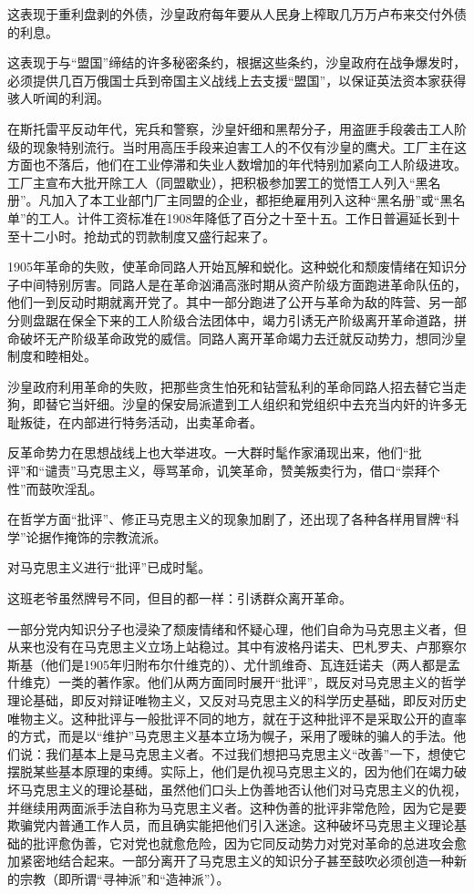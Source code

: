 这表现于重利盘剥的外债，沙皇政府每年要从人民身上榨取几万万卢布来交付外债的利息。

这表现于与“盟国”缔结的许多秘密条约，根据这些条约，沙皇政府在战争爆发时，必须提供几百万俄国士兵到帝国主义战线上去支援“盟国”，以保证英法资本家获得骇人听闻的利润。

在斯托雷平反动年代，宪兵和警察，沙皇奸细和黑帮分子，用盗匪手段袭击工人阶级的现象特别流行。当时用高压手段来迫害工人的不仅有沙皇的鹰犬。工厂主在这方面也不落后，他们在工业停滞和失业人数增加的年代特别加紧向工人阶级进攻。工厂主宣布大批开除工人（同盟歇业），把积极参加罢工的觉悟工人列入“黑名册”。凡加入了本工业部门厂主同盟的企业，都拒绝雇用列入这种“黑名册”或“黑名单”的工人。计件工资标准在1908年降低了百分之十至十五。工作日普遍延长到十至十二小时。抢劫式的罚款制度又盛行起来了。

1905年革命的失败，使革命同路人开始瓦解和蜕化。这种蜕化和颓废情绪在知识分子中间特别厉害。同路人是在革命汹涌高涨时期从资产阶级方面跑进革命队伍的，他们一到反动时期就离开党了。其中一部分跑进了公开与革命为敌的阵营、另一部分则盘踞在保全下来的工人阶级合法团体中，竭力引诱无产阶级离开革命道路，拼命破坏无产阶级革命政党的威信。同路人离开革命竭力去迁就反动势力，想同沙皇制度和睦相处。

沙皇政府利用革命的失败，把那些贪生怕死和钻营私利的革命同路人招去替它当走狗，即替它当奸细。沙皇的保安局派遣到工人组织和党组织中去充当内奸的许多无耻叛徒，在内部进行特务活动，出卖革命者。

反革命势力在思想战线上也大举进攻。一大群时髦作家涌现出来，他们“批评”和“谴责”马克思主义，辱骂革命，讥笑革命，赞美叛卖行为，借口“崇拜个性”而鼓吹淫乱。

在哲学方面“批评”、修正马克思主义的现象加剧了，还出现了各种各样用冒牌“科学”论据作掩饰的宗教流派。

对马克思主义进行“批评”已成时髦。

这班老爷虽然牌号不同，但目的都一样：引诱群众离开革命。

一部分党内知识分子也浸染了颓废情绪和怀疑心理，他们自命为马克思主义者，但从来也没有在马克思主义立场上站稳过。其中有波格丹诺夫、巴札罗夫、卢那察尔斯基（他们是1905年归附布尔什维克的）、尤什凯维奇、瓦连廷诺夫（两人都是孟什维克）一类的著作家。他们从两方面同时展开“批评”，既反对马克思主义的哲学理论基础，即反对辩证唯物主义，又反对马克思主义的科学历史基础，即反对历史唯物主义。这种批评与一般批评不同的地方，就在于这种批评不是采取公开的直率的方式，而是以“维护”马克思主义基本立场为幌子，采用了暧昧的骗人的手法。他们说：我们基本上是马克思主义者。不过我们想把马克思主义“改善”一下，想使它摆脱某些基本原理的束缚。实际上，他们是仇视马克思主义的，因为他们在竭力破坏马克思主义的理论基础，虽然他们口头上伪善地否认他们对马克思主义的仇视，并继续用两面派手法自称为马克思主义者。这种伪善的批评非常危险，因为它是要欺骗党内普通工作人员，而且确实能把他们引入迷途。这种破坏马克思主义理论基础的批评愈伪善，它对党也就愈危险，因为它同反动势力对党对革命的总进攻会愈加紧密地结合起来。一部分离开了马克思主义的知识分子甚至鼓吹必须创造一种新的宗教（即所谓“寻神派”和“造神派”）。

